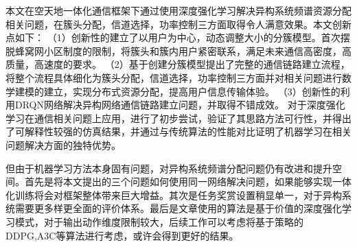 \begin{conclusions}

本文在空天地一体化通信框架下通过使用深度强化学习解决异构系统频谱资源分配相关问题，在簇头分配，信道选择，功率控制三方面取得令人满意效果。本文创新点如下：
（1）创新性的建立了以用户为中心，动态调整大小的分簇模型。首次摆脱蜂窝网小区制度的限制，将簇头和簇内用户紧密联系，满足未来通信高密度，高质量，高速度的要求。
（2）基于创建分簇模型提出了完整的通信链路建立流程，将整个流程具体细化为簇头分配，信道选择，功率控制三方面并对相关问题进行数学建模的建立，实现分布式资源分配，提高用户信息传输体验。
（3）创新性的利用DRQN网络解决异构网络通信链路建立问题，并取得不错成效。
对于深度强化学习在通信相关问题上应用，进行了初步尝试，验证了其思路方法可行性，并得出了可解释性较强的仿真结果，并通过与传统算法的性能对比证明了机器学习在相关问题解决方面的独特优势。

但由于机器学习方法本身固有问题，对异构系统频谱分配问题仍有改进和提升空间。首先是将本文提出的三个问题如何使用同一网络解决问题，如果能够实现一体化训练将会对框架整体带来巨大增益。其次是任务奖赏设置稍显单一，对于异构系统需要更多样更全面的评价体系。最后是文章使用的算法是基于价值的深度强化学习模式，对于输出动作维度限制较大，后续工作可以考虑将基于策略的DDPG,A3C等算法进行考虑，或许会得到更好的结果。
\end{conclusions}
